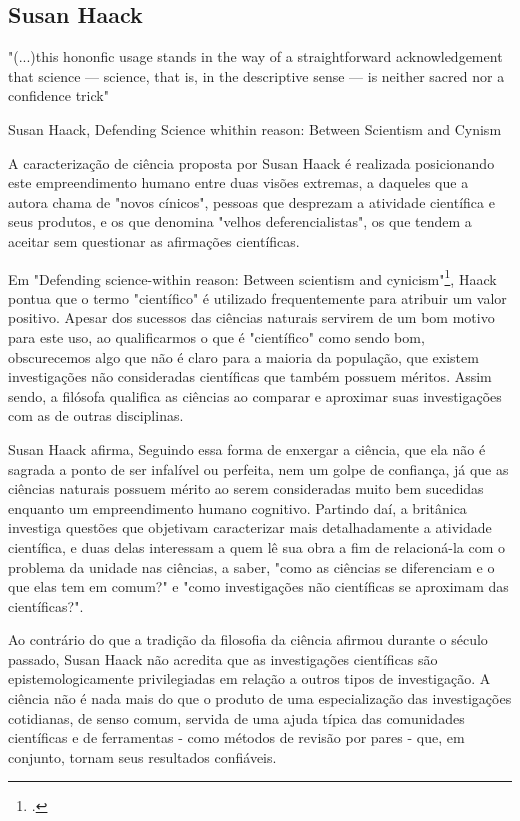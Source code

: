 \documentclass[12pt]{report}
\begin{document}
		
	\subsection{Susan Haack}
	
		\epigraph{"(...)this hononfic usage
			stands in the way of a straightforward acknowledgement
			that science — science, that is, in the descriptive sense — is
			neither sacred nor a confidence trick"}{Susan Haack, Defending Science whithin reason: Between Scientism and Cynism}
	
		A caracterização de ciência proposta por Susan Haack é realizada posicionando este empreendimento humano entre duas visões extremas, a daqueles que a autora chama de "novos cínicos", pessoas que desprezam a atividade científica e seus produtos, e os que denomina "velhos deferencialistas", os que tendem a aceitar sem questionar as afirmações científicas. 
		
		Em "Defending science-within reason: Between scientism and cynicism"\footcite{haack-defending-science}, Haack pontua que o termo "científico" é utilizado frequentemente para atribuir um valor positivo. Apesar dos sucessos das ciências naturais servirem de um bom motivo para este uso, ao qualificarmos o que é "científico" como sendo bom, obscurecemos algo que não é claro para a maioria da população, que existem investigações não consideradas científicas que também possuem méritos. Assim sendo, a filósofa qualifica as ciências ao comparar e aproximar suas investigações com as de outras disciplinas.
	
		Susan Haack afirma, Seguindo essa forma de enxergar a ciência, que ela não é sagrada a ponto de ser infalível ou perfeita, nem um golpe de confiança, já que as ciências naturais possuem mérito ao serem consideradas muito bem sucedidas enquanto um empreendimento humano cognitivo. Partindo daí, a britânica investiga questões que objetivam caracterizar mais detalhadamente a atividade científica, e duas delas interessam a quem lê sua obra a fim de relacioná-la com o problema da unidade nas ciências, a saber, "como as ciências se diferenciam e o que elas tem em comum?" e "como investigações não científicas se aproximam das científicas?".
	
		Ao contrário do que a tradição da filosofia da ciência afirmou durante o século passado, Susan Haack não acredita que as investigações científicas são epistemologicamente privilegiadas em relação a outros tipos de investigação. A ciência não é nada mais do que o produto de uma especialização das investigações cotidianas, de senso comum, servida de uma ajuda típica das comunidades científicas e de ferramentas - como métodos de revisão por pares - que, em conjunto, tornam seus resultados confiáveis.
		
\end{document}
